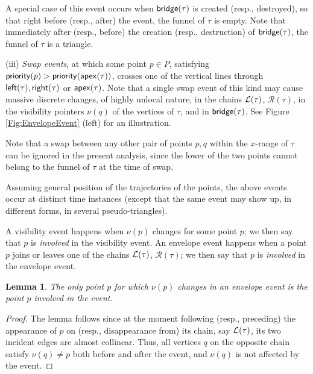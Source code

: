 \documentclass[11pt]{article}
\def\bridge{{\sf bridge}}
\def\prior{{\sf priority}}
\def\L{{\cal L}}
\def\R{\mathcal{R}}
\def\Left{{\sf left}}
\def\Right{{\sf right}}
\def\apex{{\sf apex}}
\newtheorem{lemma}[theorem]{Lemma}
\begin{document}
A special case of this event occurs when $\bridge(\tau)$ is created (resp., destroyed), so that right before (resp., after) the event, the funnel of $\tau$ is empty. Note that immediately after (resp., before) the creation (resp., destruction) of $\bridge(\tau)$, the funnel of $\tau$ is a triangle.

(iii) \textit{Swap events}, at which some point $p\in P$, satisfying
$\prior(p)>\prior(\apex(\tau))$, crosses one of the vertical lines
through $\Left(\tau),\Right(\tau)$ or $\apex(\tau)$. Note that a
single swap event of this kind may cause massive discrete changes, of
highly unlocal nature, in the chains $\L(\tau)$, $\R(\tau)$, in the visibility
pointers $\nu(q)$ of the vertices of $\tau$, and in $\bridge(\tau)$.
See Figure \ref{Fig:EnvelopeEvent} (left) for an illustration.

Note that a swap between any other pair of points $p,q$ within the $x$-range of $\tau$ can be ignored in the present analysis, since the lower of the two points cannot belong to the funnel of $\tau$ at the time of swap.

Assuming general position of the trajectories of the points,
the above events occur at distinct time instances (except that the same event may show up, in different forms, in several pseudo-triangles).

A visibility event happens when $\nu(p)$ changes for some point $p$;
we then say that $p$ is {\em involved } in the visibility event.
An envelope event happens when a point $p$ joins or leaves one
of the chains $\L(\tau)$, $\R(\tau)$;
we then say that $p$ is {\em involved } in the envelope event.

\begin{lemma}\label{Lemma:ingoingEnvelopeEvent}
The only point $p$ for which $\nu(p)$ changes in an envelope event
is the point $p$ involved in the event.
\end{lemma}

\begin{proof}
 The lemma follows since at
  the moment following (resp., preceding) the appearance of $p$ on
  (resp., disappearance from) its chain, say $\L(\tau)$, its
  two incident edges are almost collinear. Thus, all vertices $q$ on
  the opposite chain satisfy $\nu(q)\neq p$ both before and
  after the event, and $\nu(q)$ is not affected by the event.
\end{proof}
\end{document}
